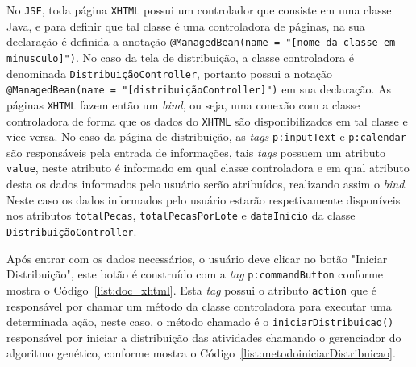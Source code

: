 \par No \texttt{JSF}, toda página \texttt{XHTML} possui um controlador que
consiste em uma classe Java, e para definir que tal classe é uma controladora de páginas, na sua declaração é definida a anotação \texttt{@ManagedBean(name = "[nome da classe em minusculo]")}.
No caso da tela de distribuição, a classe controladora é denominada \texttt{DistribuiçãoController}, portanto possui a notação
\texttt{@ManagedBean(name = "[distribuiçãoController]")} em sua declaração. As páginas \texttt{XHTML} fazem então um \textit{bind}, ou
seja, uma conexão com a classe controladora de forma que os dados do \texttt{XHTML} são disponibilizados em tal classe e vice-versa. 
No caso da página de distribuição, as \textit{tags} \texttt{p:inputText} e \texttt{p:calendar} são responsáveis pela entrada de 
informações, tais \textit{tags} possuem um atributo \texttt{value}, neste atributo é informado em qual classe controladora e em qual 
atributo desta os dados informados pelo usuário serão atribuídos, realizando assim o \textit{bind}. Neste caso os dados informados pelo 
usuário estarão respetivamente disponíveis nos atributos \texttt{totalPecas}, \texttt{totalPecasPorLote} e \texttt{dataInicio} da
classe \texttt{DistribuiçãoController}.

\par Após entrar com os dados necessários, o usuário deve clicar no botão "Iniciar Distribuição", este botão é construído com a
\textit{tag} \texttt{p:commandButton} conforme mostra o Código~\ref{list:doc_xhtml}. Esta \textit{tag} possui o atributo \texttt{action} que 
é responsável por chamar um método da classe controladora para executar uma determinada ação, neste caso, o método chamado é o 
\texttt{iniciarDistribuicao()} responsável por iniciar a distribuição das atividades chamando o gerenciador do algoritmo genético, 
conforme mostra o Código~\ref{list:metodoiniciarDistribuicao}.

